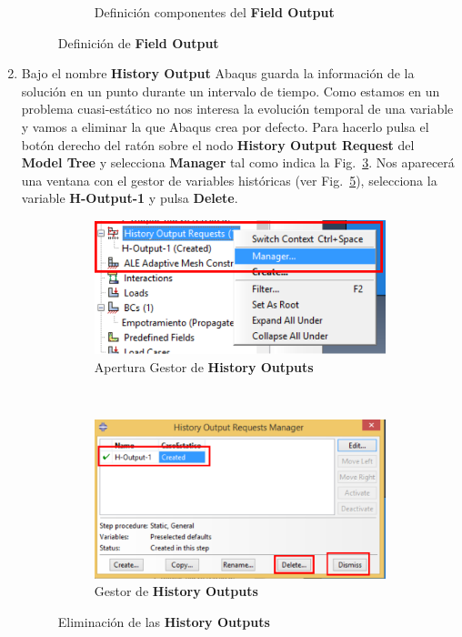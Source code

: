 \begin{enumerate}
\begin{figure}[H]
\begin{subfigure}{0.40\textwidth}
      \caption{Definición componentes del \textbf{Field Output}}
      \label{figu33}
    \end{subfigure}%
    \caption{Definición de \textbf{Field Output}}
  \end{figure}
\item Bajo el nombre \textbf{History Output} Abaqus guarda la
  información de la solución en un punto durante un intervalo de
  tiempo. Como estamos en un problema cuasi-estático no nos interesa
  la evolución temporal de una variable y vamos a eliminar la que
  Abaqus crea por defecto. Para hacerlo pulsa el botón derecho del
  ratón sobre el nodo \textbf{History Output Request} del
  \textbf{Model Tree} y selecciona \textbf{Manager} tal como indica la
  Fig.~\ref{figu41}. Nos aparecerá una ventana con el gestor de
  variables históricas (ver Fig.~\ref{figu42}), selecciona la variable
  \textbf{H-Output-1} y pulsa \textbf{Delete}.
  \begin{figure}[H]
    \centering
    \begin{subfigure}{0.45\textwidth}
      \includegraphics[width=\textwidth]{./body/images/imagen41.pdf}
      \caption{Apertura Gestor de \textbf{History Outputs}}
      \label{figu41}
    \end{subfigure}%
    ~ %
    \begin{subfigure}{0.45\textwidth}
      \includegraphics[width=\textwidth]{./body/images/imagen42.pdf}
      \caption{Gestor de \textbf{History Outputs}}
      \label{figu42}
    \end{subfigure}%
    \caption{Eliminación de las \textbf{History Outputs}}
  \end{figure}
\end{enumerate}
\newpage
